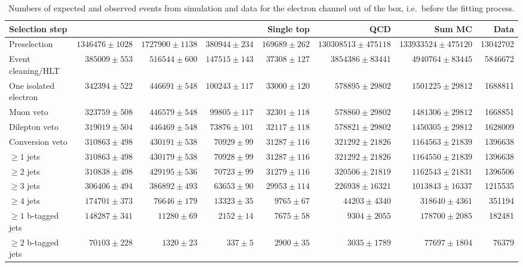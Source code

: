 \begin{table}
  \centering
   \caption{Numbers of expected and observed events from simulation and data
   for the electron channel out of the box, i.e.\ before the fitting process.}
    \label{tab:event_yields_ejets}
    \resizebox{\columnwidth}{!} {
    \begin{tabular}{lrrrrrrr}
    \toprule
	\textbf{Selection step} & \textbf{\ttjets} & \textbf{\WpJets} & \textbf{\ZpJets} & \textbf{Single top} & \textbf{QCD} & \textbf{Sum MC} & \textbf{Data} \\
	\midrule
	Preselection  &  $1346476 \pm 1028$ &  $1727900 \pm 1138$ &  $380944 \pm 234$ &  $169689 \pm 262$ &  $130308513 \pm 475118$ &  $133933524 \pm 475120$ &  13042702 \\ 
	Event cleaning/HLT  &  $385009 \pm 553$ &  $516544 \pm 600$ &  $147515 \pm 143$ &  $37308 \pm 127$ &  $3854386 \pm 83441$ &  $4940764 \pm 83445$ &  5846672 \\ 
	One isolated electron  &  $342394 \pm 522$ &  $446691 \pm 548$ &  $100243 \pm 117$ &  $33000 \pm 120$ &  $578895 \pm 29802$ &  $1501225 \pm 29812$ &  1688811 \\ 
	Muon veto  &  $323759 \pm 508$ &  $446579 \pm 548$ &  $99805 \pm 117$ &  $32301 \pm 118$ &  $578860 \pm 29802$ &  $1481306 \pm 29812$ &  1668851 \\ 
	Dilepton veto  &  $319019 \pm 504$ &  $446469 \pm 548$ &  $73876 \pm 101$ &  $32117 \pm 118$ &  $578821 \pm 29802$ &  $1450305 \pm 29812$ &  1628009 \\ 
	Conversion veto  &  $310863 \pm 498$ &  $430191 \pm 538$ &  $70929 \pm 99$ &  $31287 \pm 116$ &  $321292 \pm 21826$ &  $1164563 \pm 21839$ &  1396638 \\ 
	$\geq 1$ jets  &  $310863 \pm 498$ &  $430179 \pm 538$ &  $70928 \pm 99$ &  $31287 \pm 116$ &  $321292 \pm 21826$ &  $1164550 \pm 21839$ &  1396638 \\ 
	$\geq 2$ jets  &  $310838 \pm 498$ &  $429195 \pm 536$ &  $70723 \pm 99$ &  $31279 \pm 116$ &  $320506 \pm 21819$ &  $1162543 \pm 21831$ &  1396506 \\ 
	$\geq 3$ jets  &  $306406 \pm 494$ &  $386892 \pm 493$ &  $63653 \pm 90$ &  $29953 \pm 114$ &  $226938 \pm 16321$ &  $1013843 \pm 16337$ &  1215535 \\ 
	$\geq 4$ jets  &  $174701 \pm 373$ &  $76646 \pm 179$ &  $13323 \pm 35$ &  $9765 \pm 67$ &  $44203 \pm 4340$ &  $318640 \pm 4361$ &  351194 \\ 
	$\geq 1$ b-tagged jets  &  $148287 \pm 341$ &  $11280 \pm 69$ &  $2152 \pm 14$ &  $7675 \pm 58$ &  $9304 \pm 2055$ &  $178700 \pm 2085$ &  182481 \\ 
	$\geq 2$ b-tagged jets  &  $70103 \pm 228$ &  $1320 \pm 23$ &  $337 \pm 5$ &  $2900 \pm 35$ &  $3035 \pm 1789$ &  $77697 \pm 1804$ &  76379 \\ 
	\bottomrule
	\end{tabular}
	}
\end{table}

